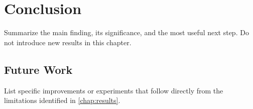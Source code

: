 \chapter{Conclusion}
\label{chap:conclusion}

Summarize the main finding, its significance, and the most useful next step.
Do not introduce new results in this chapter.

\section{Future Work}

List specific improvements or experiments that follow directly from the
limitations identified in \cref{chap:results}.
